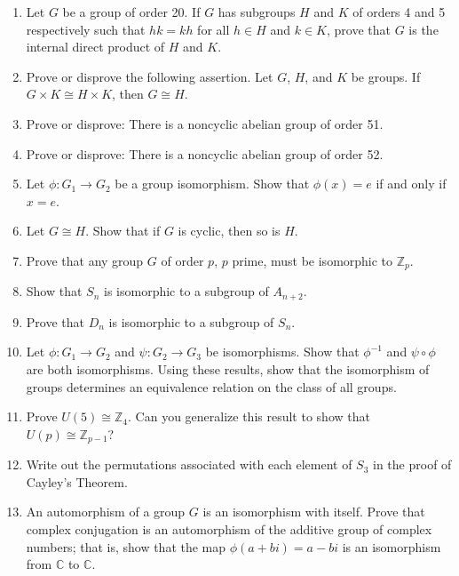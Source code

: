 {\begin{enumerate}
\item
Let $G$ be a group of order 20. If $G$ has subgroups $H$ and $K$ of
orders 4 and 5 respectively such that $hk = kh$ for all $h \in H$ and
$k \in K$, prove that $G$ is the internal direct product of $H$ and $K$. 
 

\item
Prove or disprove the following assertion. Let $G$, $H$, and $K$ be
groups. If $G \times K \cong H \times K$, then $G \cong H$. 
 

\item
Prove or disprove: There is a noncyclic abelian group of order 51. 
 

\item
Prove or disprove: There is a noncyclic abelian group of order 52. 
 
 

\item
Let $\phi : G_1 \rightarrow G_2$ be a group isomorphism. Show that
$\phi( x) = e$ if and only if $x=e$. 
 

\item
Let $G \cong H$. Show that if $G$ is cyclic, then so is $H$.
 

\item
Prove that any group $G$ of order $p$, $p$  prime, must be isomorphic
to ${\mathbb Z}_p$. 
 

\item
Show that $S_n$ is isomorphic to a subgroup of $A_{n+2}$.  

\item
Prove that $D_n$ is isomorphic to a subgroup of $S_n$.
 

\item
Let $\phi : G_1 \rightarrow G_2$ and  $\psi : G_2 \rightarrow G_3$  be
isomorphisms. Show that  $\phi^{-1}$ and $\psi \circ \phi$ are both
isomorphisms. Using these results, show that the isomorphism of groups
determines an equivalence relation on the class of all groups.
 

\item
Prove $U(5) \cong {\mathbb Z}_4$. Can you generalize this result to show
that $U(p) \cong {\mathbb Z}_{p-1}$? 
 

\item
Write out the permutations associated with each element of $S_3$ in
the proof of Cayley's Theorem. 
 
 

\item
An {\bfi automorphism\/} of a group $G$ is an isomorphism
with itself. Prove that complex conjugation is an automorphism of the
additive group of complex numbers; that is, show that the map $\phi(
a + bi ) = a - bi$ is an isomorphism from ${\mathbb C}$ to ${\mathbb C}$. 
 


\end{enumerate}}
